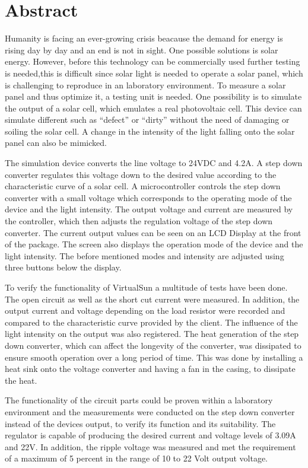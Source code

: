 \documentclass[a4paper]{fhnwreport}
\begin{document}
\section{Abstract}

Humanity is facing an ever-growing crisis beacause the demand for energy is rising day by day and an end is not in sight. One possible solutions is solar energy. However, before this technology can be commercially used further testing is needed,this is difficult since solar light is needed to operate a solar panel, which is challenging to reproduce in an laboratory environment. To measure a solar panel and thus optimize it, a testing unit is needed. One possibility is to simulate the output of a solar cell, which emulates a real photovoltaic cell. This device can simulate different such as ``defect'' or ``dirty'' without the need of damaging or soiling the solar cell. A change in the intensity of the light falling onto the solar panel can also be mimicked.

The simulation device converts the line voltage to 24VDC and 4.2A. A step down converter regulates this voltage down to the desired value according to the characteristic curve of a solar cell. A microcontroller controls the step down converter with a small voltage which corresponds to the operating mode of the device and the light intensity. The output voltage and current are measured by the controller, which then adjusts the regulation voltage of the step down converter. The current output values can be seen on an LCD Display at the front of the package. The screen also displays the operation mode of the device and the light intensity. The before mentioned modes and intensity are adjusted using three buttons below the display. 

To verify the functionality of VirtualSun a multitude of tests have been done. The open circuit as well as the short cut current were measured. In addition, the output current and voltage depending on the load resistor were recorded and compared to the characteristic curve provided by the client. The influence of the light intensity on the output was also registered. The heat generation of the step down converter, which can affect the longevity of the converter, was dissipated to ensure smooth operation over a long period of time. This was done by installing a heat sink onto the voltage converter and having a fan in the casing, to dissipate the heat.

The functionality of the circuit parts could be proven within a laboratory environment and the measurements were conducted on the step down converter instead of the devices output, to verify its function and its suitability. The regulator is capable of producing the desired current and voltage levels of 3.09A and 22V. In addition, the ripple voltage was measured and met the requirement of a maximum of 5 percent in the range of 10 to 22 Volt output voltage.
\end{document}
